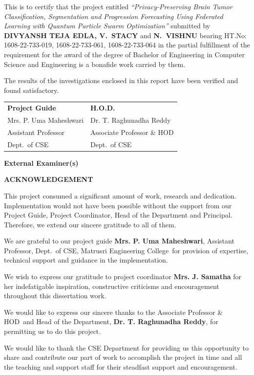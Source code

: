 \documentclass[12pt,a4paper,oneside]{report}
\newcommand{\projecttitle}{Privacy-Preserving Brain Tumor Classification, Segmentation and Progression Forecasting Using Federated Learning with Quantum Particle Swarm Optimization}
\newcommand{\guidename}{Mrs. P. Uma Maheshwari}
\newcommand{\guidetitle}{Assistant Professor}
\newcommand{\coordinatorname}{Mrs. J. Samatha}
\newcommand{\hodname}{Dr. T. Raghunadha Reddy}
\newcommand{\hodtitle}{Associate Professor \& HOD}
\newcommand{\collegename}{Matrusri Engineering College}
\begin{document}
This is to certify that the project entitled \textit{``\projecttitle''} submitted by \textbf{DIVYANSH TEJA EDLA, V.~STACY} and \textbf{N.~VISHNU} bearing HT.No: 1608-22-733-019, 1608-22-733-061, 1608-22-733-064 in the partial fulfillment of the requirement for the award of the degree of Bachelor of Engineering in Computer Science and Engineering is a bonafide work carried by them.

The results of the investigations enclosed in this report have been verified and found satisfactory.

\vspace{3cm}
\noindent
\begin{tabular}{p{7cm}p{7cm}}
\textbf{Project Guide} & \textbf{H.O.D.}\\[1.5cm]
\guidename & \hodname\\
\guidetitle & \hodtitle\\
Dept.\ of CSE & Dept.\ of CSE\\
\end{tabular}

\vspace{2cm}
\begin{center}
\textbf{External Examiner(s)}
\end{center}

\newpage
\begin{center}
{\Large\bfseries ACKNOWLEDGEMENT}\\[1cm]
\end{center}

This project consumed a significant amount of work, research and dedication. Implementation would not have been possible without the support from our Project Guide, Project Coordinator, Head of the Department and Principal. Therefore, we extend our sincere gratitude to all of them.

We are grateful to our project guide \textbf{\guidename}, \guidetitle, Dept.\ of CSE, \collegename\ for provision of expertise, technical support and guidance in the implementation.

We wish to express our gratitude to project coordinator \textbf{\coordinatorname} for her indefatigable inspiration, constructive criticisms and encouragement throughout this dissertation work.

We would like to express our sincere thanks to the \hodtitle\ and Head of the Department, \textbf{\hodname}, for permitting us to do this project.

We would like to thank the CSE Department for providing us this opportunity to share and contribute our part of work to accomplish the project in time and all the teaching and support staff for their steadfast support and encouragement.
\end{document}

